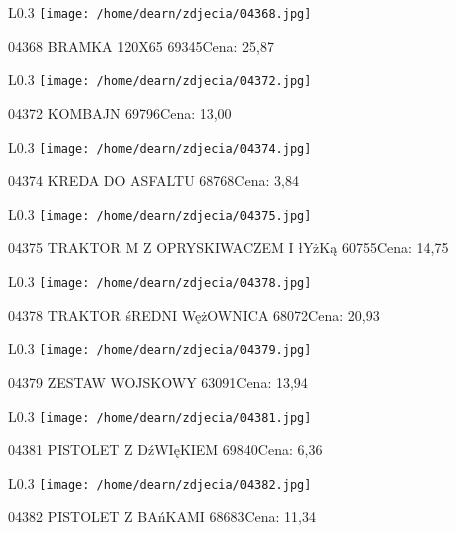 \begin{wrapfigure}{L}{0.3\textwidth}
\texttt{[image: /home/dearn/zdjecia/04368.jpg]}
\end{wrapfigure}
04368 BRAMKA 120X65                                   69345Cena: 25,87\newline
\begin{wrapfigure}{L}{0.3\textwidth}
\texttt{[image: /home/dearn/zdjecia/04372.jpg]}
\end{wrapfigure}
04372 KOMBAJN                                      69796Cena: 13,00\newline
\begin{wrapfigure}{L}{0.3\textwidth}
\texttt{[image: /home/dearn/zdjecia/04374.jpg]}
\end{wrapfigure}
04374 KREDA DO ASFALTU                                68768Cena: 3,84\newline
\begin{wrapfigure}{L}{0.3\textwidth}
\texttt{[image: /home/dearn/zdjecia/04375.jpg]}
\end{wrapfigure}
04375 TRAKTOR M Z OPRYSKIWACZEM I łYżKą               60755Cena: 14,75\newline
\begin{wrapfigure}{L}{0.3\textwidth}
\texttt{[image: /home/dearn/zdjecia/04378.jpg]}
\end{wrapfigure}
04378 TRAKTOR śREDNI WężOWNICA                         68072Cena: 20,93\newline
\begin{wrapfigure}{L}{0.3\textwidth}
\texttt{[image: /home/dearn/zdjecia/04379.jpg]}
\end{wrapfigure}
04379 ZESTAW WOJSKOWY                                  63091Cena: 13,94\newline
\begin{wrapfigure}{L}{0.3\textwidth}
\texttt{[image: /home/dearn/zdjecia/04381.jpg]}
\end{wrapfigure}
04381 PISTOLET Z DźWIęKIEM                             69840Cena: 6,36\newline
\begin{wrapfigure}{L}{0.3\textwidth}
\texttt{[image: /home/dearn/zdjecia/04382.jpg]}
\end{wrapfigure}
04382 PISTOLET Z BAńKAMI                               68683Cena: 11,34\newline
